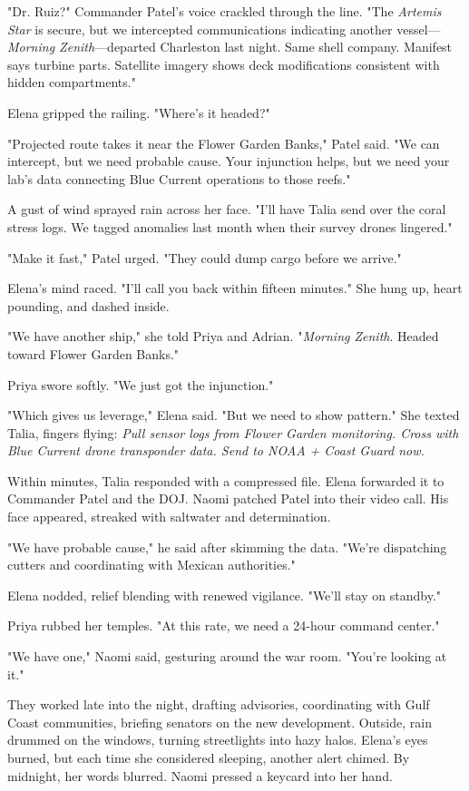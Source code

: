 "Dr. Ruiz?" Commander Patel's voice crackled through the line. "The \textit{Artemis Star} is secure, but we intercepted communications indicating another vessel—\textit{Morning Zenith}—departed Charleston last night. Same shell company. Manifest says turbine parts. Satellite imagery shows deck modifications consistent with hidden compartments."

Elena gripped the railing. "Where's it headed?"

"Projected route takes it near the Flower Garden Banks," Patel said. "We can intercept, but we need probable cause. Your injunction helps, but we need your lab's data connecting Blue Current operations to those reefs."

A gust of wind sprayed rain across her face. "I'll have Talia send over the coral stress logs. We tagged anomalies last month when their survey drones lingered."

"Make it fast," Patel urged. "They could dump cargo before we arrive."

Elena's mind raced. "I'll call you back within fifteen minutes." She hung up, heart pounding, and dashed inside.

"We have another ship," she told Priya and Adrian. "\textit{Morning Zenith}. Headed toward Flower Garden Banks."

Priya swore softly. "We just got the injunction."

"Which gives us leverage," Elena said. "But we need to show pattern." She texted Talia, fingers flying: \textit{Pull sensor logs from Flower Garden monitoring. Cross with Blue Current drone transponder data. Send to NOAA + Coast Guard now.}

Within minutes, Talia responded with a compressed file. Elena forwarded it to Commander Patel and the DOJ. Naomi patched Patel into their video call. His face appeared, streaked with saltwater and determination.

"We have probable cause," he said after skimming the data. "We're dispatching cutters and coordinating with Mexican authorities."

Elena nodded, relief blending with renewed vigilance. "We'll stay on standby."

Priya rubbed her temples. "At this rate, we need a 24-hour command center."

"We have one," Naomi said, gesturing around the war room. "You're looking at it."

They worked late into the night, drafting advisories, coordinating with Gulf Coast communities, briefing senators on the new development. Outside, rain drummed on the windows, turning streetlights into hazy halos. Elena's eyes burned, but each time she considered sleeping, another alert chimed. By midnight, her words blurred. Naomi pressed a keycard into her hand.

